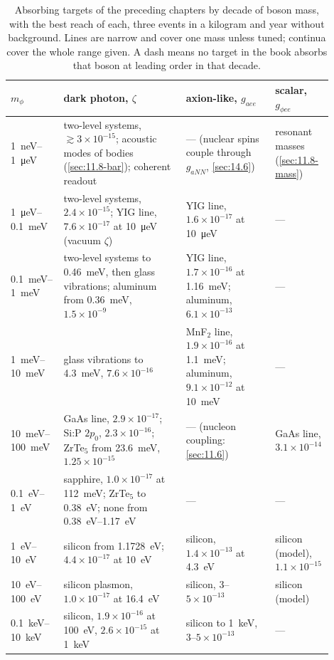 \begin{table}[tbp]
  \centering
  \caption{Absorbing targets of the preceding chapters by decade of boson mass, with the best reach of each, three events in a kilogram and year without background. Lines are narrow and cover one mass unless tuned; continua cover the whole range given. A dash means no target in the book absorbs that boson at leading order in that decade.}
  \label{tab:17-abs-decades}
  \small
  \begin{tabular}{@{}>{\raggedright\arraybackslash}p{0.12\linewidth}>{\raggedright\arraybackslash}p{0.37\linewidth}>{\raggedright\arraybackslash}p{0.27\linewidth}>{\raggedright\arraybackslash}p{0.14\linewidth}@{}}
    \toprule
    $m_\phi$ & dark photon, $\zeta$ & axion-like, $g_{aee}$ & scalar, $g_{\phi ee}$ \\
    \midrule
    \SI{1}{neV}--\SI{1}{\micro eV} & two-level systems, $\gtrsim 3\times10^{-15}$; acoustic modes of bodies (\cref{sec:11.8-bar}); coherent readout & --- (nuclear spins couple through $g_{aNN}$, \cref{sec:14.6}) & resonant masses (\cref{sec:11.8-mass}) \\
    \SI{1}{\micro eV}--\SI{0.1}{meV} & two-level systems, $2.4\times10^{-15}$; YIG line, $7.6\times10^{-17}$ at \SI{10}{\micro eV} (vacuum $\zeta$) & YIG line, $1.6\times10^{-17}$ at \SI{10}{\micro eV} & --- \\
    \SIrange{0.1}{1}{meV} & two-level systems to \SI{0.46}{meV}, then glass vibrations; aluminum from \SI{0.36}{meV}, $1.5\times10^{-9}$ & YIG line, $1.7\times10^{-16}$ at \SI{1.16}{meV}; aluminum, $6.1\times10^{-13}$ & --- \\
    \SIrange{1}{10}{meV} & glass vibrations to \SI{4.3}{meV}, $7.6\times10^{-16}$ & MnF$_2$ line, $1.9\times10^{-16}$ at \SI{1.1}{meV}; aluminum, $9.1\times10^{-12}$ at \SI{10}{meV} & --- \\
    \SIrange{10}{100}{meV} & GaAs line, $2.9\times10^{-17}$; Si:P $2p_0$, $2.3\times10^{-16}$; ZrTe$_5$ from \SI{23.6}{meV}, $1.25\times10^{-15}$ & --- (nucleon coupling: \cref{sec:11.6}) & GaAs line, $3.1\times10^{-14}$ \\
    \SIrange{0.1}{1}{eV} & sapphire, $1.0\times10^{-17}$ at \SI{112}{meV}; ZrTe$_5$ to \SI{0.38}{eV}; none from \SIrange{0.38}{1.17}{eV} & --- & --- \\
    \SIrange{1}{10}{eV} & silicon from \SI{1.1728}{eV}; $4.4\times10^{-17}$ at \SI{10}{eV} & silicon, $1.4\times10^{-13}$ at \SI{4.3}{eV} & silicon (model), $1.1\times10^{-15}$ \\
    \SIrange{10}{100}{eV} & silicon plasmon, $1.0\times10^{-17}$ at \SI{16.4}{eV} & silicon, $3$--$5\times10^{-13}$ & silicon (model) \\
    \SIrange{0.1}{10}{keV} & silicon, $1.9\times10^{-16}$ at \SI{100}{eV}, $2.6\times10^{-15}$ at \SI{1}{keV} & silicon to \SI{1}{keV}, $3$--$5\times10^{-13}$ & --- \\
    \bottomrule
  \end{tabular}
\end{table}

